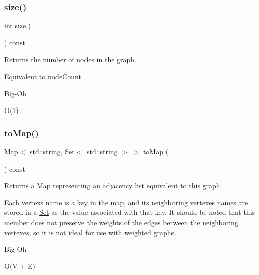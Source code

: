 \subsubsection{\texorpdfstring{size()}{size()}}
{\footnotesize\ttfamily int size (\begin{DoxyParamCaption}{ }\end{DoxyParamCaption}) const\hspace{0.3cm}{\ttfamily [inherited]}}



Returns the number of nodes in the graph. 

Equivalent to node\+Count. \begin{DoxyRefDesc}{Big-\/\+Oh}
\item[\mbox{\hyperlink{BigOh__BigOh000089}{Big-\/\+Oh}}]O(1) \end{DoxyRefDesc}
\mbox{\label{classBasicGraphGen_a66498d3675a5bc08fa30a032d41764f7}} 
\subsubsection{\texorpdfstring{to\+Map()}{toMap()}}
{\footnotesize\ttfamily \mbox{\hyperlink{classMap}{Map}}$<$ std\+::string, \mbox{\hyperlink{classSet}{Set}}$<$ std\+::string $>$ $>$ to\+Map (\begin{DoxyParamCaption}{ }\end{DoxyParamCaption}) const}



Returns a \mbox{\hyperlink{classMap}{Map}} representing an adjacency list equivalent to this graph. 

Each vertex\textquotesingle{}s name is a key in the map, and its neighboring vertexes\textquotesingle{} names are stored in a \mbox{\hyperlink{classSet}{Set}} as the value associated with that key. It should be noted that this member does not preserve the weights of the edges between the neighboring vertexes, so it is not ideal for use with weighted graphs. \begin{DoxyRefDesc}{Big-\/\+Oh}
\item[\mbox{\hyperlink{BigOh__BigOh000036}{Big-\/\+Oh}}]O(V + E) \end{DoxyRefDesc}
\mbox{\label{classGraph_a1fe5121d6528fdea3f243321b3fa3a49}} 
